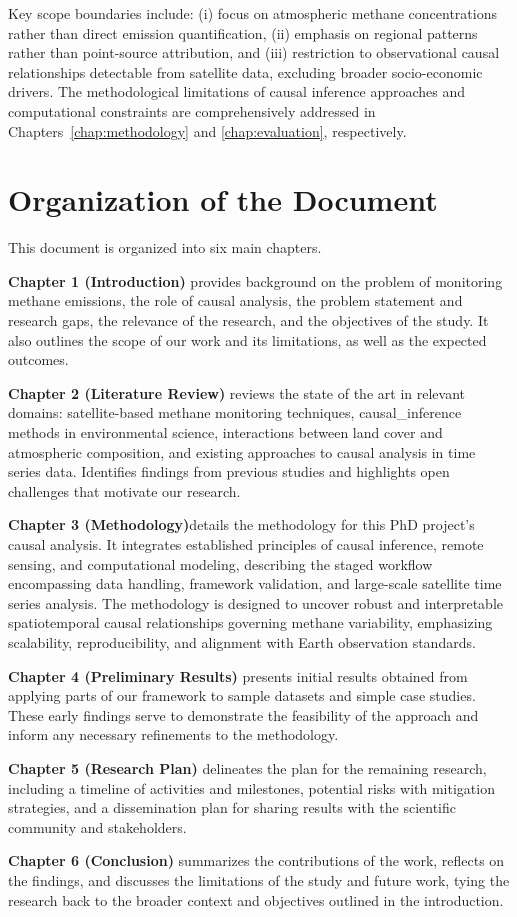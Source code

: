 Key scope boundaries include: (i) focus on atmospheric methane concentrations rather than direct emission quantification, (ii) emphasis on regional patterns rather than point-source attribution, and (iii) restriction to observational causal relationships detectable from satellite data, excluding broader socio-economic drivers. The methodological limitations of causal inference approaches and computational constraints are comprehensively addressed in Chapters~\ref{chap:methodology} and \ref{chap:evaluation}, respectively.

\section{Organization of the Document}
This document is organized into six main chapters.

\textbf{Chapter 1 (Introduction)} provides background on the problem of monitoring methane emissions, the role of causal analysis, the problem statement and research gaps, the relevance of the research, and the objectives of the study. It also outlines the scope of our work and its limitations, as well as the expected outcomes.

\textbf{Chapter 2 (Literature Review)} reviews the state of the art in relevant domains: satellite-based methane monitoring techniques, \gls{causal_inference} methods in environmental science, interactions between land cover and atmospheric composition, and existing approaches to causal analysis in time series data. Identifies findings from previous studies and highlights open challenges that motivate our research.

\textbf{Chapter 3 (Methodology)}details the methodology for this PhD project's causal analysis. It integrates established principles of causal inference, remote sensing, and computational modeling, describing the staged workflow encompassing data handling, framework validation, and large-scale satellite time series analysis. The methodology is designed to uncover robust and interpretable spatiotemporal causal relationships governing methane variability, emphasizing scalability, reproducibility, and alignment with Earth observation standards.

\textbf{Chapter 4 (Preliminary Results)} presents initial results obtained from applying parts of our framework to sample datasets and simple case studies. These early findings serve to demonstrate the feasibility of the approach and inform any necessary refinements to the methodology.

\textbf{Chapter 5 (Research Plan)} delineates the plan for the remaining research, including a timeline of activities and milestones, potential risks with mitigation strategies, and a dissemination plan for sharing results with the scientific community and stakeholders.

\textbf{Chapter 6 (Conclusion)} summarizes the contributions of the work, reflects on the findings, and discusses the limitations of the study and future work, tying the research back to the broader context and objectives outlined in the introduction.

